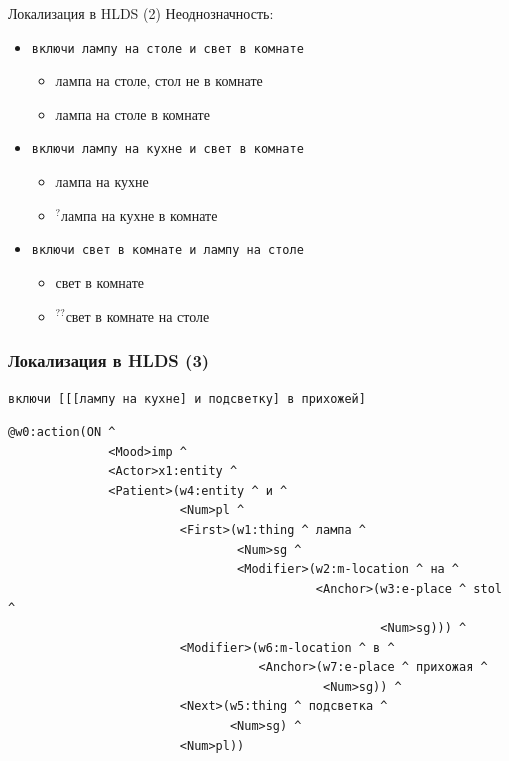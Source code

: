 \documentclass{beamer}
\begin{document}
\begin{frame}{Локализация в HLDS (2)}
Неоднозначность:\\
\bigskip
\begin{itemize}
	\item \texttt{включи лампу на столе и свет в комнате}
		\begin{itemize}
			\item {\footnotesize лампа на столе, стол не в комнате}
			\item {\footnotesize лампа на столе в комнате}
		\end{itemize}
	\bigskip
	\item \texttt{включи лампу на кухне и свет в комнате}
		\begin{itemize}
			\item {\footnotesize лампа на кухне}
			\item {\footnotesize $^?$лампа на кухне в комнате}
		\end{itemize}
	\bigskip
	\item \texttt{включи свет в комнате и лампу на столе}
		\begin{itemize}
			\item {\footnotesize свет в комнате}
			\item {\footnotesize $^{??}$свет в комнате на столе}
		\end{itemize}
\end{itemize}
\end{frame}

\begin{frame}[fragile]
\frametitle{Локализация в HLDS (3)}
\texttt{включи [[[лампу на кухне] и подсветку] в прихожей]}\\
\begin{center}
{\scriptsize \begin{verbatim}
@w0:action(ON ^ 
              <Mood>imp ^ 
              <Actor>x1:entity ^ 
              <Patient>(w4:entity ^ и ^ 
                        <Num>pl ^ 
                        <First>(w1:thing ^ лампа ^ 
                                <Num>sg ^ 
                                <Modifier>(w2:m-location ^ на ^ 
                                           <Anchor>(w3:e-place ^ stol ^ 
                                                    <Num>sg))) ^ 
                        <Modifier>(w6:m-location ^ в ^ 
                                   <Anchor>(w7:e-place ^ прихожая ^ 
                                            <Num>sg)) ^ 
                        <Next>(w5:thing ^ подсветка ^ 
                               <Num>sg) ^ 
                        <Num>pl))
\end{verbatim}
}                        
\end{center}
\end{frame}
\end{document}

